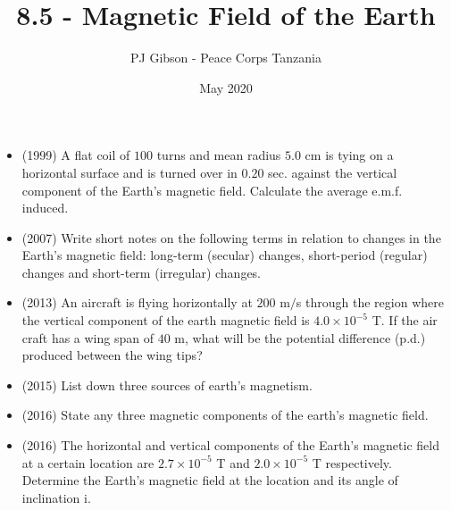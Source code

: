 \documentclass{article}
\title{\textbf{8.5 - Magnetic Field of the Earth}}
\author{PJ Gibson - Peace Corps Tanzania}
\date{May 2020}
\begin{document}
\maketitle

\begin{itemize}
\item (1999)  A flat coil of $ 100$ turns and mean radius $ 5.0$ cm is tying on a horizontal surface and is turned over in $ 0.20$ sec. against the vertical component of the Earth's magnetic field. Calculate the average e.m.f. induced.
\item (2007)  Write short notes on the following terms in relation to changes in the Earth's magnetic field:  long-term (secular) changes, short-period (regular) changes and short-term (irregular) changes.
\item (2013)  An aircraft is flying horizontally at $ 200$ m$/$s through the region where the vertical component of the earth magnetic field is $ 4.0 \times 10^{-5}$ T. If the air craft has a wing span of $ 40$ m, what will be the potential difference (p.d.) produced between the wing tips? 
\item (2015)  List down three sources of earth's magnetism. 
\item (2016)  State any three magnetic components of the earth’s magnetic field.
\item (2016)  The horizontal and vertical components of the Earth’s magnetic field at a certain location are $ 2.7 \times 10^{-5}$ T and $ 2.0 \times 10^{-5}$ T respectively.  Determine the Earth’s magnetic field at the location and its angle of inclination i.
\end{itemize}
\end{document}
